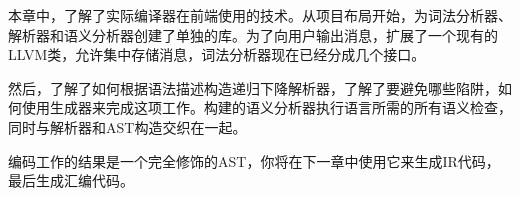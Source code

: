 本章中，了解了实际编译器在前端使用的技术。从项目布局开始，为词法分析器、解析器和语义分析器创建了单独的库。为了向用户输出消息，扩展了一个现有的LLVM类，允许集中存储消息，词法分析器现在已经分成几个接口。

然后，了解了如何根据语法描述构造递归下降解析器，了解了要避免哪些陷阱，如何使用生成器来完成这项工作。构建的语义分析器执行语言所需的所有语义检查，同时与解析器和AST构造交织在一起。

编码工作的结果是一个完全修饰的AST，你将在下一章中使用它来生成IR代码，最后生成汇编代码。
